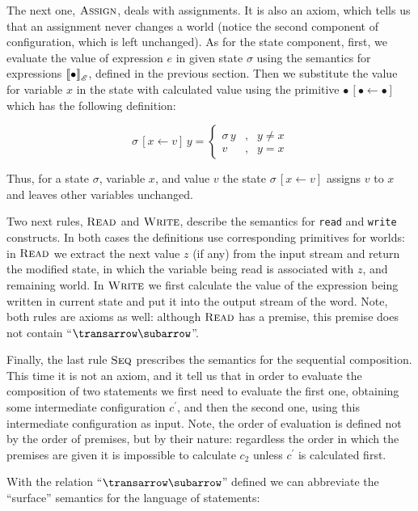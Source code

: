 The next one, $\textsc{Assign}$, deals with assignments. It is also an axiom, which tells us that an
assignment never changes a world (notice the second component of configuration, which is left unchanged).
As for the state component, first, we evaluate the value of expression $e$ in given state $\sigma$ using
the semantics for expressions $\sembr{\bullet}^\ph_\mathscr{E}$, defined in the previous section. Then we
substitute the value for variable $x$ in the state with calculated value using the primitive $\bullet\,[\bullet\gets \bullet]$
which has the following definition:

\[
\sigma\,[x\gets v]\,y=\left\{\begin{array}{rcl}
                                \sigma\,y & , & y \ne x\\
                                v & , & y = x
                             \end{array}
                   \right.
\]

Thus, for a state $\sigma$, variable $x$, and value $v$ the state $\sigma\,[x\gets v]$ assigns $v$ to $x$ and leaves other
variables unchanged.

Two next rules, $\textsc{Read}$ and $\textsc{Write}$, describe the semantics for \lstinline|read| and
\lstinline|write| constructs. In both cases the definitions use corresponding primitives for worlds: in $\textsc{Read}$
we extract the next value $z$ (if any) from the input stream and return the modified state, in which the variable being
read is associated with $z$, and remaining world. In $\textsc{Write}$ we first calculate the value of the expression
being written in current state and put it into the output stream of the word. Note, both rules are axioms as well:
although $\textsc{Read}$ has a premise, this premise does not contain ``$\transrel$''.

Finally, the last rule $\textsc{Seq}$ prescribes the semantics for the sequential composition. This time it is
not an axiom, and it tell us that in order to evaluate the composition of two statements we first need to
evaluate the first one, obtaining some intermediate configuration $c^\prime$, and then the second one, using
this intermediate configuration as input. Note, the order of evaluation is defined not by the order of
premises, but by their nature: regardless the order in which the premises are given it is impossible
to calculate $c_2$ unless $c^\prime$ is calculated first.

With the relation ``$\transrel$'' defined we can abbreviate the ``surface'' semantics for the language of statements:

